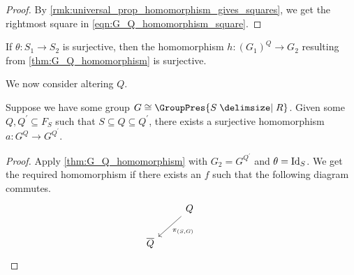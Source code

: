 \begin{proof}
	By \cref{rmk:universal_prop_homomorphism_gives_squares}, we get the rightmost square in \eqref{eqn:G_Q_homomorphism_square}.
\end{proof}

\begin{corollary}
	If $\theta \colon S_1 \to S_2$ is surjective, then the homomorphism $h \colon (G_1)^Q \to G_2$ resulting from \cref{thm:G_Q_homomorphism} is surjective.
\end{corollary}

We now consider altering $Q$.

\begin{corollary}
	Suppose we have some group $G \cong \GroupPres{S \relations R}$.
	Given some $Q,Q^\prime \subseteq F_{S}$ such that $S \subseteq Q \subseteq Q^\prime$, there exists a surjective homomorphism $a: G^{Q} \to G^{Q^\prime}$.
\end{corollary}

\begin{proof}
	Apply \cref{thm:G_Q_homomorphism} with $G_2 = G^{Q^\prime}$ and $\theta = \operatorname{Id}_S$. We get the required homomorphism if there exists an $f$ such that the following diagram commutes.
	\begin{equation*}
		\begin{tikzcd}
			& Q \ar[dl, "\pi_{(S,G)}"] &
			\\ \overline{Q}
		\end{tikzcd}
	\end{equation*}
\end{proof}


